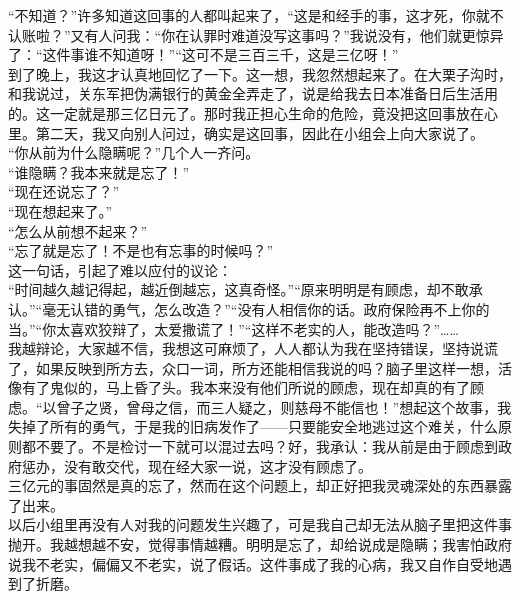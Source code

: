“不知道？”许多知道这回事的人都叫起来了，“这是和经手的事，这才死，你就不认账啦？”又有人问我：“你在认罪时难道没写这事吗？”我说没有，他们就更惊异了：“这件事谁不知道呀！”“这可不是三百三千，这是三亿呀！”\\

到了晚上，我这才认真地回忆了一下。这一想，我忽然想起来了。在大栗子沟时，和我说过，关东军把伪满银行的黄金全弄走了，说是给我去日本准备日后生活用的。这一定就是那三亿日元了。那时我正担心生命的危险，竟没把这回事放在心里。第二天，我又向别人问过，确实是这回事，因此在小组会上向大家说了。\\

“你从前为什么隐瞒呢？”几个人一齐问。\\

“谁隐瞒？我本来就是忘了！”\\

“现在还说忘了？”\\

“现在想起来了。”\\

“怎么从前想不起来？”\\

“忘了就是忘了！不是也有忘事的时候吗？”\\

这一句话，引起了难以应付的议论：\\

“时间越久越记得起，越近倒越忘，这真奇怪。”“原来明明是有顾虑，却不敢承认。”“毫无认错的勇气，怎么改造？”“没有人相信你的话。政府保险再不上你的当。”“你太喜欢狡辩了，太爱撒谎了！”“这样不老实的人，能改造吗？”……\\

我越辩论，大家越不信，我想这可麻烦了，人人都认为我在坚持错误，坚持说谎了，如果反映到所方去，众口一词，所方还能相信我说的吗？脑子里这样一想，活像有了鬼似的，马上昏了头。我本来没有他们所说的顾虑，现在却真的有了顾虑。“以曾子之贤，曾母之信，而三人疑之，则慈母不能信也！”想起这个故事，我失掉了所有的勇气，于是我的旧病发作了——只要能安全地逃过这个难关，什么原则都不要了。不是检讨一下就可以混过去吗？好，我承认：我从前是由于顾虑到政府惩办，没有敢交代，现在经大家一说，这才没有顾虑了。\\

三亿元的事固然是真的忘了，然而在这个问题上，却正好把我灵魂深处的东西暴露了出来。\\

以后小组里再没有人对我的问题发生兴趣了，可是我自己却无法从脑子里把这件事抛开。我越想越不安，觉得事情越糟。明明是忘了，却给说成是隐瞒；我害怕政府说我不老实，偏偏又不老实，说了假话。这件事成了我的心病，我又自作自受地遇到了折磨。\\

